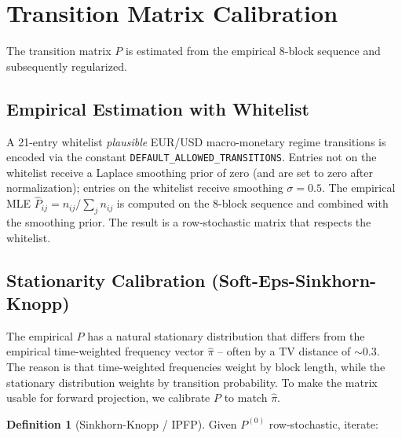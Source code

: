\documentclass[11pt,a4paper]{article}
\theoremstyle{definition}
\newtheorem{definition}{Definition}
\begin{document}
\section{Transition Matrix Calibration}
\label{sec:transition}

The transition matrix $P$ is estimated from the empirical 8-block sequence and subsequently regularized.

\subsection{Empirical Estimation with Whitelist}

A 21-entry whitelist \emph{plausible} EUR/USD macro-monetary regime transitions is encoded via the constant \texttt{DEFAULT\_ALLOWED\_TRANSITIONS}. Entries not on the whitelist receive a Laplace smoothing prior of zero (and are set to zero after normalization); entries on the whitelist receive smoothing $\sigma = 0.5$. The empirical MLE $\hat{P}_{ij} = n_{ij}/\sum_j n_{ij}$ is computed on the 8-block sequence and combined with the smoothing prior. The result is a row-stochastic matrix that respects the whitelist.

\subsection{Stationarity Calibration (Soft-Eps-Sinkhorn-Knopp)}

The empirical $P$ has a natural stationary distribution that differs from the empirical time-weighted frequency vector $\hat{\pi}$ -- often by a TV distance of $\sim 0.3$. The reason is that time-weighted frequencies weight by block length, while the stationary distribution weights by transition probability. To make the matrix usable for forward projection, we calibrate $P$ to match $\hat{\pi}$.

\begin{definition}[Sinkhorn-Knopp / IPFP]
Given $P^{(0)}$ row-stochastic, iterate:
\end{definition}
\end{document}
